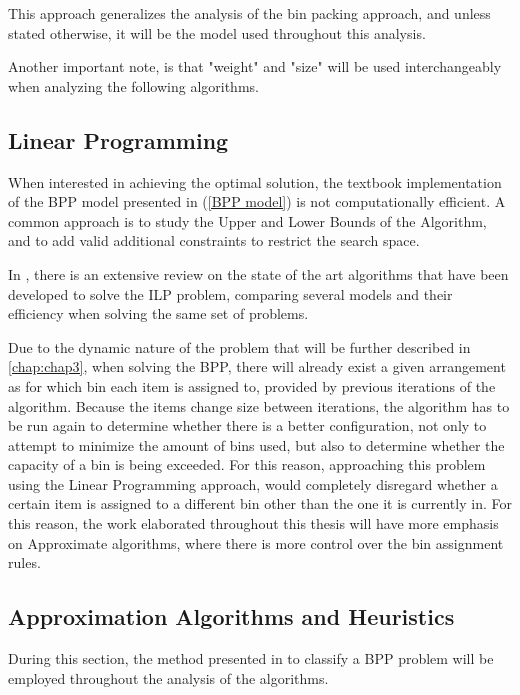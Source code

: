 This approach generalizes the analysis of the bin packing approach, and unless stated otherwise, it will be the model used throughout this analysis. 

Another important note, is that "weight" and "size" will be used interchangeably when analyzing the following algorithms. 

\subsection{Linear Programming}

When interested in achieving the optimal solution, the textbook implementation of the BPP model presented in (\ref{BPP model}) is not computationally efficient. A common approach is to study the Upper and Lower Bounds of the Algorithm, and to add valid additional constraints to restrict the search space.

In \cite{delorme2016bin}, there is an extensive review on the state of the art algorithms that have been developed to solve the ILP problem, comparing several models and their efficiency when solving the same set of problems. 

Due to the dynamic nature of the problem that will be further described in \ref{chap:chap3}, when solving the BPP, there will already exist a given arrangement as for which bin each item is assigned to, provided by previous iterations of the algorithm. Because the items change size between iterations, the algorithm has to be run again to determine whether there is a better configuration, not only to attempt to minimize the amount of bins used, but also to determine whether the capacity of a bin is being exceeded. For this reason, approaching this problem using the Linear Programming approach, would completely disregard whether a certain item is assigned to a different bin other than the one it is currently in. For this reason, the work elaborated throughout this thesis will have more emphasis on Approximate algorithms, where there is more control over the bin assignment rules.

\subsection{Approximation Algorithms and Heuristics}
\label{sub:Approximation Algorithms and Heuristics}

During this section, the method presented in \cite{coffman2013bin} to classify a BPP problem will be employed throughout the analysis of the algorithms.

